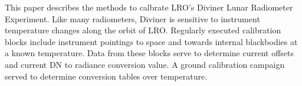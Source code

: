 This paper describes the methods to calbrate LRO's Diviner Lunar Radiometer Experiment. 
Like many radiometers, Diviner is sensitive to instrument temperature changes along the orbit of LRO.
Regularly executed calibration blocks include instrument pointings to space and towards internal blackbodies at a known temperature.
Data from these blocks serve to determine current offsets and current DN to radiance conversion value.
A ground calibration campaign served to determine conversion tables over temperature.
